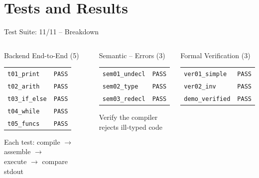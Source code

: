 \documentclass[aspectratio=169,11pt]{beamer}
\begin{document}
\section{Tests and Results}

\begin{frame}{Test Suite: 11/11 -- Breakdown}
\begin{columns}[t]
  \begin{block}{Backend End-to-End (5)}
    \small
    \begin{tabular}{ll}
      \texttt{t01\_print}    & {\color{accent}\texttt{PASS}} \\
      \texttt{t02\_arith}    & {\color{accent}\texttt{PASS}} \\
      \texttt{t03\_if\_else} & {\color{accent}\texttt{PASS}} \\
      \texttt{t04\_while}    & {\color{accent}\texttt{PASS}} \\
      \texttt{t05\_funcs}    & {\color{accent}\texttt{PASS}} \\
    \end{tabular}
    \vspace{0.2cm}

    Each test: compile $\to$ assemble $\to$\\
    execute $\to$ compare stdout
  \end{block}

  \begin{block}{Semantic -- Errors (3)}
    \small
    \begin{tabular}{ll}
      \texttt{sem01\_undecl}  & {\color{accent}\texttt{PASS}} \\
      \texttt{sem02\_type}    & {\color{accent}\texttt{PASS}} \\
      \texttt{sem03\_redecl}  & {\color{accent}\texttt{PASS}} \\
    \end{tabular}
    \vspace{0.2cm}

    Verify the compiler\\
    rejects ill-typed code
  \end{block}

  \begin{block}{Formal Verification (3)}
    \small
    \begin{tabular}{ll}
      \texttt{ver01\_simple}  & {\color{accent}\texttt{PASS}} \\
      \texttt{ver02\_inv}     & {\color{accent}\texttt{PASS}} \\
      \texttt{demo\_verified} & {\color{accent}\texttt{PASS}} \\
    \end{tabular}
    \vspace{0.2cm}


\end{block}
\end{columns}
\end{frame}
\end{document}
